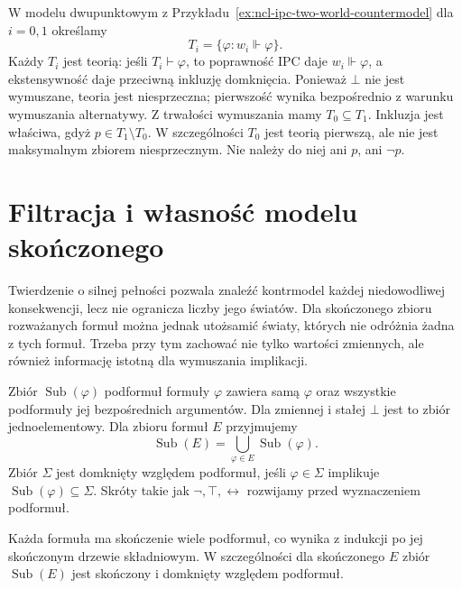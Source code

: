 \begin{przyklad}
\label{ex:ncl-ipc-prime-not-maximal}
W modelu dwupunktowym z
Przykładu~\ref{ex:ncl-ipc-two-world-countermodel}
dla $i=0,1$ określamy
\[
 T_i=\{\varphi:w_i\Vdash\varphi\}.
\]
Każdy $T_i$ jest teorią: jeśli $T_i\vdash\varphi$,
to poprawność IPC daje $w_i\Vdash\varphi$,
a ekstensywność daje przeciwną inkluzję domknięcia.
Ponieważ $\bot$ nie jest wymuszane, teoria jest
niesprzeczna; pierwszość wynika bezpośrednio
z warunku wymuszania alternatywy.
Z trwałości wymuszania mamy $T_0\subseteq T_1$.
Inkluzja jest właściwa, gdyż $p\in T_1\setminus T_0$.
W szczególności $T_0$ jest teorią pierwszą, ale
nie jest maksymalnym zbiorem niesprzecznym.
Nie należy do niej ani $p$, ani $\neg p$.
\end{przyklad}

\section{Filtracja i własność modelu skończonego}

Twierdzenie o silnej pełności pozwala znaleźć kontrmodel
każdej niedowodliwej konsekwencji, lecz nie ogranicza
liczby jego światów. Dla skończonego zbioru rozważanych
formuł można jednak utożsamić światy, których nie
odróżnia żadna z tych formuł. Trzeba przy tym zachować
nie tylko wartości zmiennych, ale również informację
istotną dla wymuszania implikacji.

\begin{definicja}
\label{def:ncl-ipc-subformulas}
Zbiór $\operatorname{Sub}(\varphi)$ podformuł formuły
$\varphi$ zawiera samą $\varphi$ oraz wszystkie
podformuły jej bezpośrednich argumentów.
Dla zmiennej i stałej $\bot$ jest to zbiór jednoelementowy.
Dla zbioru formuł $E$ przyjmujemy
\[
 \operatorname{Sub}(E)=
 \bigcup_{\varphi\in E}\operatorname{Sub}(\varphi).
\]
Zbiór $\Sigma$ jest domknięty względem podformuł,
jeśli $\varphi\in\Sigma$ implikuje
$\operatorname{Sub}(\varphi)\subseteq\Sigma$.
Skróty takie jak $\neg,\top,\leftrightarrow$
rozwijamy przed wyznaczeniem podformuł.
\end{definicja}
Każda formuła ma skończenie wiele podformuł,
co wynika z indukcji po jej skończonym drzewie
składniowym. W szczególności dla skończonego $E$
zbiór $\operatorname{Sub}(E)$ jest skończony
i domknięty względem podformuł.

